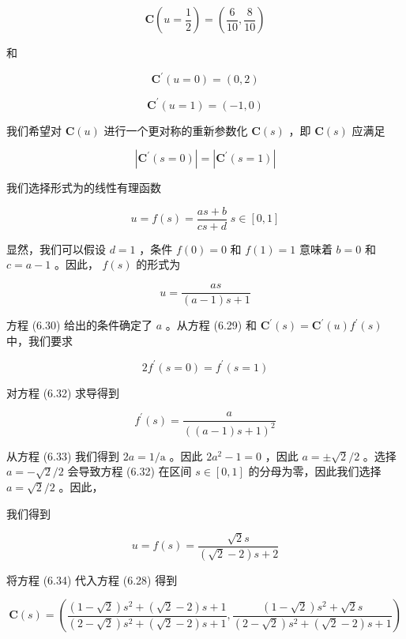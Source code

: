 \documentclass[../main.tex]{subfiles}
\begin{document}
\[
\mathbf{C}\left( {u = \frac{1}{2}}\right)  = \left( {\frac{6}{10},\frac{8}{10}}\right)
\]

和

\[
{\mathbf{C}}^{\prime }\left( {u = 0}\right)  = \left( {0,2}\right)
\]

\[
{\mathbf{C}}^{\prime }\left( {u = 1}\right)  = \left( {-1,0}\right)  \tag{6.29}
\]

我们希望对 \(\mathbf{C}\left( u\right)\) 进行一个更对称的重新参数化 \(\mathbf{C}\left( s\right)\) ，即 \(\mathbf{C}\left( s\right)\) 应满足

\[
\left| {{\mathbf{C}}^{\prime }\left( {s = 0}\right) }\right|  = \left| {{\mathbf{C}}^{\prime }\left( {s = 1}\right) }\right|  \tag{6.30}
\]

我们选择形式为的线性有理函数

\[
u = f\left( s\right)  = \frac{{as} + b}{{cs} + d}\;s \in  \left\lbrack  {0,1}\right\rbrack   \tag{6.31}
\]

显然，我们可以假设 \(d = 1\) ，条件 \(f\left( 0\right)  = 0\) 和 \(f\left( 1\right)  = 1\) 意味着 \(b = 0\) 和 \(c = a - 1\) 。因此， \(f\left( s\right)\) 的形式为

\[
u = \frac{as}{\left( {a - 1}\right) s + 1} \tag{6.32}
\]

方程 (6.30) 给出的条件确定了 \(a\) 。从方程 (6.29) 和 \({\mathbf{C}}^{\prime }\left( s\right)  = {\mathbf{C}}^{\prime }\left( u\right) {f}^{\prime }\left( s\right)\) 中，我们要求

\[
2{f}^{\prime }\left( {s = 0}\right)  = {f}^{\prime }\left( {s = 1}\right)  \tag{6.33}
\]

对方程 (6.32) 求导得到

\[
{f}^{\prime }\left( s\right)  = \frac{a}{{\left( \left( a - 1\right) s + 1\right) }^{2}}
\]

从方程 (6.33) 我们得到 \({2a} = 1/\mathrm{a}\) 。因此 \(2{a}^{2} - 1 = 0\) ，因此 \(a =  \pm  \sqrt{2}/2\) 。选择 \(a =  - \sqrt{2}/2\) 会导致方程 (6.32) 在区间 \(s \in  \left\lbrack  {0,1}\right\rbrack\) 的分母为零，因此我们选择 \(a = \sqrt{2}/2\) 。因此，

我们得到

\[
u = f\left( s\right)  = \frac{\sqrt{2}s}{\left( {\sqrt{2} - 2}\right) s + 2} \tag{6.34}
\]

将方程 (6.34) 代入方程 (6.28) 得到

\[
\mathbf{C}\left( s\right)  = \left( {\frac{\left( {1 - \sqrt{2}}\right) {s}^{2} + \left( {\sqrt{2} - 2}\right) s + 1}{\left( {2 - \sqrt{2}}\right) {s}^{2} + \left( {\sqrt{2} - 2}\right) s + 1},\frac{\left( {1 - \sqrt{2}}\right) {s}^{2} + \sqrt{2}s}{\left( {2 - \sqrt{2}}\right) {s}^{2} + \left( {\sqrt{2} - 2}\right) s + 1}}\right)
\]
\end{document}
